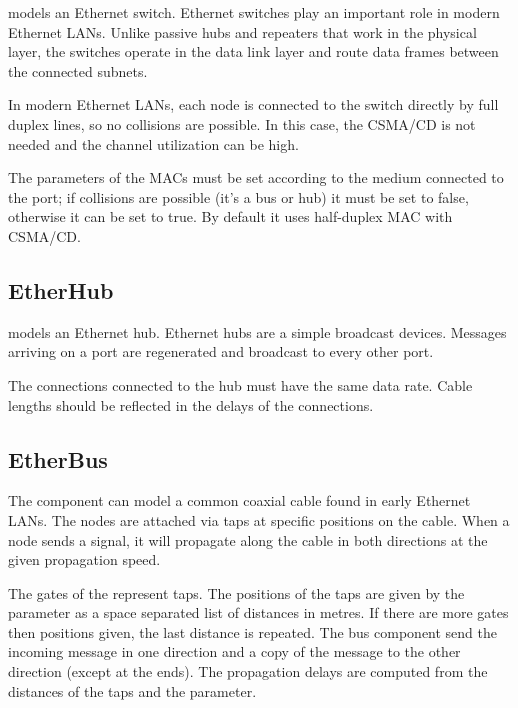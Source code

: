  models an Ethernet switch. Ethernet switches play an
important role in modern Ethernet LANs. Unlike passive hubs and repeaters that
work in the physical layer, the switches operate in the data link layer and
route data frames between the connected subnets.

In modern Ethernet LANs, each node is connected to the switch directly by full
duplex lines, so no collisions are possible. In this case, the CSMA/CD is not
needed and the channel utilization can be high.

The  parameters of the MACs must be set according to the
medium connected to the port; if collisions are possible (it's a bus or hub)
it must be set to false, otherwise it can be set to true.
By default it uses half-duplex MAC with CSMA/CD.

\subsection{EtherHub}
\label{sec:ethernet:etherhub}

 models an Ethernet hub. Ethernet hubs are a simple broadcast
devices. Messages arriving on a port are regenerated and broadcast to every
other port.

The connections connected to the hub must have the same data rate.
Cable lengths should be reflected in the delays of the connections.


\subsection{EtherBus}
\label{sec:ethernet:etherbus}

The  component can model a common coaxial cable
found in early Ethernet LANs. The nodes are attached via taps at specific
positions on the cable. When a node sends a signal, it will propagate
along the cable in both directions at the given propagation speed.

The gates of the  represent taps. The positions
of the taps are given by the  parameter as a
space separated list of distances in metres. If there are more
gates then positions given, the last distance is repeated.
The bus component send the incoming message in one direction and
a copy of the message to the other direction (except at the ends).
The propagation delays are computed from the distances of the taps
and the  parameter.


